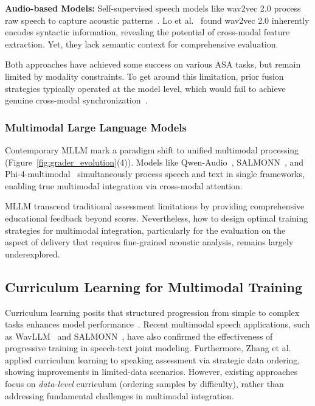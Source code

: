 \documentclass[conference]{IEEEtran}
\begin{document}
\textbf{Audio-based Models:} Self-supervised speech models like wav2vec 2.0 process raw speech to capture acoustic patterns~\cite{Baevski20-Wav2Vec2,BannoM_SLT2022}. Lo et al.~\cite{Lo2024AnEA} found wav2vec 2.0 inherently encodes syntactic information, revealing the potential of cross-modal feature extraction. Yet, they lack semantic context for comprehensive evaluation.

Both approaches have achieved some success on various ASA tasks, but remain limited by modality constraints. To get around this limitation, prior fusion strategies typically operated at the model level, which would fail to achieve genuine cross-modal synchronization~\cite{ParkU23}.

\subsubsection{Multimodal Large Language Models}
Contemporary MLLM mark a paradigm shift to unified multimodal processing (Figure~\ref{fig:grader_evolution}(4)). Models like Qwen-Audio~\cite{Qwen2Audio}, SALMONN~\cite{Tang2024SALMONN}, and Phi-4-multimodal~\cite{Microsoft2025Phi4MiniTR} simultaneously process speech and text in single frameworks, enabling true multimodal integration via cross-modal attention.

MLLM transcend traditional assessment limitations by providing comprehensive educational feedback beyond scores. Nevertheless, how to design optimal training strategies for multimodal integration, particularly for the evaluation on the aspect of delivery that requires fine-grained acoustic analysis, remains largely underexplored.

\subsection{Curriculum Learning for Multimodal Training}
Curriculum learning posits that structured progression from simple to complex tasks enhances model performance~\cite{Bengio2009CurriculumL}. Recent multimodal speech applications, such as WavLLM~\cite{Chen2024WavLLM} and SALMONN~\cite{Tang2024SALMONN}, have also confirmed the effectiveness of progressive training in speech-text joint modeling. Furthermore, Zhang et al.~\cite{Zhang2024OversamplingAA} applied curriculum learning to speaking assessment via strategic data ordering, showing improvements in limited-data scenarios. However, existing approaches focus on \textit{data-level} curriculum (ordering samples by difficulty), rather than addressing fundamental challenges in multimodal integration.
\end{document}
